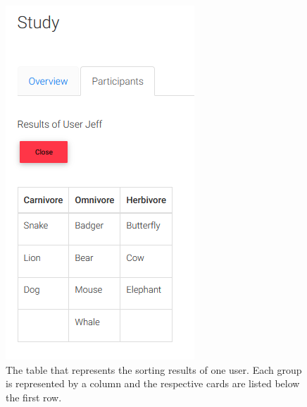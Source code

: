 \begin{figure}[tp]  \centering
\includegraphics[keepaspectratio,width=\linewidth,height=\halfh]{images/implementation/table.png}
\caption[Card Sorting Result Table] 
{The table that represents the sorting results of one user. Each group is represented
by a column and the respective cards are listed below the first row.
 } 
\label{fig:table} 
\end{figure}